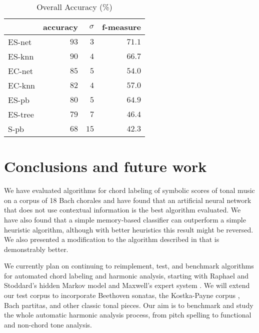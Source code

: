 \documentclass{article}
\begin{document}
\begin{table}
  \centering
  \begin{tabular}{l|rrr}
       & accuracy& $\sigma$  & f-measure\\
\hline
ES-net &$   93  $&$  3$      &$71.1$ \\
ES-knn &$   90  $&$  4$      &$66.7$ \\
EC-net &$   85  $&$  5$      &$54.0$ \\
EC-knn &$   82  $&$  4$      &$57.0$ \\
ES-pb  &$   80  $&$  5$      &$64.9$ \\
ES-tree&$   79  $&$  7$      &$46.4$ \\
S-pb   &$   68  $&$ 15$      &$42.3$ \\

  \end{tabular}                                                        


  \caption{Overall Accuracy (\%)}
  \label{tab:accuracy}
\end{table}

\section{Conclusions and future work}
\label{sec:conclusions}

We have evaluated algorithms for chord labeling of symbolic scores of
tonal music on a corpus of 18 Bach chorales and have found that an
artificial neural network that does not use contextual information is
the best algorithm evaluated. We have also found that a simple
memory-based classifier can outperform a simple heuristic algorithm,
although with better heuristics this result might be reversed. We also
presented a modification to the algorithm described in
\cite{pardo.ea02:algorithms} that is demonstrably better.

We currently plan on continuing to reimplement, test, and benchmark
algorithms for automated chord labeling and harmonic analysis,
starting with Raphael and Stoddard's hidden Markov model
\cite{raphael.ea03:harmonic} and Maxwell's expert system
\cite{maxwell92:expert}.  We will extend our test corpus to
incorporate Beethoven sonatas, the Kostka-Payne corpus
\cite{temperley04:bayesian}, Bach partitas, and other classic tonal
pieces. Our aim is to benchmark and study the whole automatic harmonic
analysis process, from pitch spelling to functional and non-chord tone
analysis.



\end{document}
